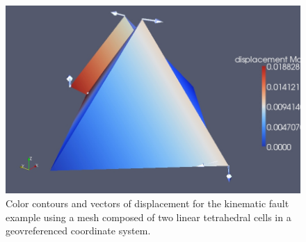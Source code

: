 \begin{figure}
\begin{centering}
\includegraphics[scale=0.33]{tutorials/twocells/figs/twotet4-geoproj-dislocation}
\par\end{centering}

\caption{Color contours and vectors of displacement for the kinematic fault
example using a mesh composed of two linear tetrahedral cells in a
geovreferenced coordinate system.\label{fig:twotet4-geoproj-disloc}}
\end{figure}

